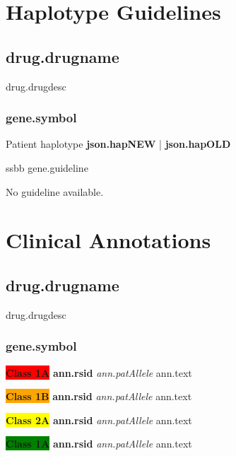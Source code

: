 \documentclass{book}
\begin{document}
\newpage


\section{Haplotype Guidelines}

{%

\subsection{ {{drug.drugname}} }
{{drug.drugdesc}}
{%
{%
\subsubsection{ {{gene.symbol}} }

\begin{center}
Patient haplotype
\textbf{ {{json.hapNEW}} } | \textbf{ {{json.hapOLD}} } \newline\newline
\scriptsize
\begin{tabularx}{\textwidth}{ssbb}
{{gene.guideline}}
\end{tabularx}

\end{center}
{%
{%
No guideline available.
{%
{%
\newpage
\normalsize


\section{Clinical Annotations}

{%

\subsection{ {{drug.drugname}} }
{{drug.drugdesc}}

{%
{%
\subsubsection{ {{gene.symbol}} }

\begin{center}
{%
\textbf{\colorbox{red} {Class 1A}} \textbf{ {{ann.rsid}} } \textit{ {{ann.patAllele}} }
{{ann.text}}
{%
{%
\textbf{\colorbox{orange} {Class 1B}} \textbf{ {{ann.rsid}} } \textit{ {{ann.patAllele}} }
{{ann.text}}
{%
{%
\textbf{\colorbox{yellow} {Class 2A}} \textbf{ {{ann.rsid}} } \textit{ {{ann.patAllele}} }
{{ann.text}}
{%
{%
\textbf{\colorbox{green} {Class 1A}} \textbf{ {{ann.rsid}} } \textit{ {{ann.patAllele}} }
{{ann.text}}
{%

}}}}}}}}
\end{center}}}}}}}}}}}
\end{document}
